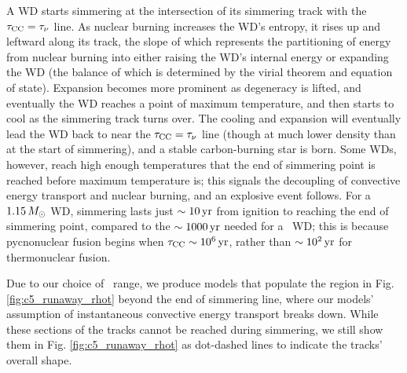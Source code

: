 A WD starts simmering at the intersection of its simmering track with the $\taucc = \taunu$ line.  As nuclear burning increases the WD's entropy, it rises up and leftward along its track, the slope of which represents the partitioning of energy from nuclear burning into either raising the WD's internal energy or expanding the WD (the balance of which is determined by the virial theorem and equation of state).  Expansion becomes more prominent as degeneracy is lifted, and eventually the WD reaches a point of maximum temperature, and then starts to cool as the simmering track turns over.  The cooling and expansion will eventually lead the WD back to near the $\taucc = \taunu$ line (though at much lower density than at the start of simmering), and a stable carbon-burning star is born.  Some WDs, however, reach high enough temperatures that the end of simmering point is reached before maximum temperature is; this signals the decoupling of convective energy transport and nuclear burning, and an explosive event follows.  For a $1.15\,\Msun$ WD, simmering lasts just $\sim10\,\mathrm{yr}$ from ignition to reaching the end of simmering point, compared to the $\sim1000\,\mathrm{yr}$ needed for a \Mch\ WD; this is because pycnonuclear fusion begins when $\taucc \sim 10^6\,\mrm{yr}$, rather than $\sim10^{2}\,\mathrm{yr}$ for thermonuclear fusion.




Due to our choice of \Sc\ range, we produce models that populate the region in Fig. \ref{fig:c5_runaway_rhot} beyond the end of simmering line, where our models' assumption of instantaneous convective energy transport breaks down.  While these sections of the tracks cannot be reached during simmering, we still show them in Fig. \ref{fig:c5_runaway_rhot} as dot-dashed lines to indicate the tracks' overall shape.


